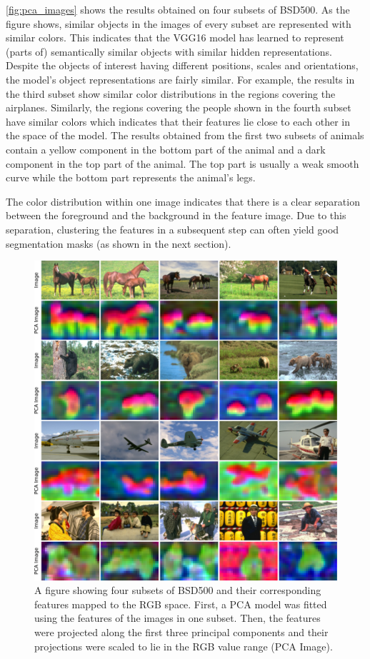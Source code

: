 \autoref{fig:pca_images} shows the results obtained on four subsets of BSD500. As the figure shows, similar objects in the images of every subset are represented with similar colors. This indicates that the VGG16 model has learned to represent (parts of) semantically similar objects with similar hidden representations. Despite the objects of interest having different positions, scales and orientations, the model's object representations are fairly similar. For example, the results in the third subset show similar color distributions in the regions covering the airplanes. Similarly, the regions covering the people shown in the fourth subset have similar colors which indicates that their features lie close to each other in the space of the model. The results obtained from the first two subsets of animals contain a yellow component in the bottom part of the animal and a dark component in the top part of the animal. The top part is usually a weak smooth curve while the bottom part represents the animal's legs.

The color distribution within one image indicates that there is a clear separation between the foreground and the background in the feature image. Due to this separation, clustering the features in a subsequent step can often yield good segmentation masks (as shown in the next section).

\begin{figure}[thbp]
    \centering
    \includegraphics[width=\textwidth]{figures/pca_images.pdf}
    \caption{A figure showing four subsets of BSD500 and their corresponding features mapped to the RGB space. First, a PCA model was fitted using the features of the images in one subset. Then, the features were projected along the first three principal components and their projections were scaled to lie in the RGB value range (PCA Image).}
    \label{fig:pca_images}
\end{figure}

